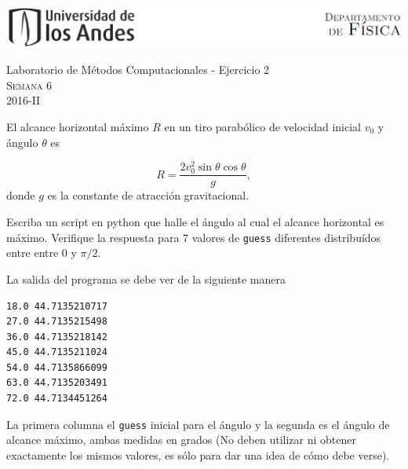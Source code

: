\documentclass[11pt,letterpaper]{exam}
\begin{document}
\begin{center}

\includegraphics[width=16cm]{header.png}

\vspace{1.0cm}
{\Large Laboratorio de M\'etodos Computacionales - Ejercicio 2} \\
\textsc{Semana 6}\\
2016-II\\
\end{center}



\vspace{0.5cm}

\noindent

\vspace{0.5cm}

\begin{questions}
 
\question[5.0] {}

El alcance horizontal m\'aximo $R$ en un tiro parab\'olico de velocidad inicial $v_0$ y \'angulo $\theta$ es

\begin{equation*}
R = \frac{2v_0^2\sin \theta \cos \theta}{g},
\end{equation*}
donde $g$ es la constante de atracci\'on gravitacional.

Escriba un script en python que halle el \'angulo al cual el alcance horizontal es m\'aximo. Verifique la respuesta para $7$ valores de \verb'guess' diferentes distribu\'idos entre entre $0$ y $\pi/2$.

La salida del programa se debe ver de la siguiente manera

\begin{verbatim}
18.0 44.7135210717
27.0 44.7135215498
36.0 44.7135218142
45.0 44.7135211024
54.0 44.7135866099
63.0 44.7135203491
72.0 44.7134451264
\end{verbatim}

La primera columna el \verb'guess' inicial para el \'angulo y la segunda es el \'angulo de alcance m\'aximo, ambas medidas en grados (No deben utilizar ni obtener exactamente los mismos valores, es s\'olo para dar una idea de c\'omo debe verse).

\end{questions}
\end{document}

